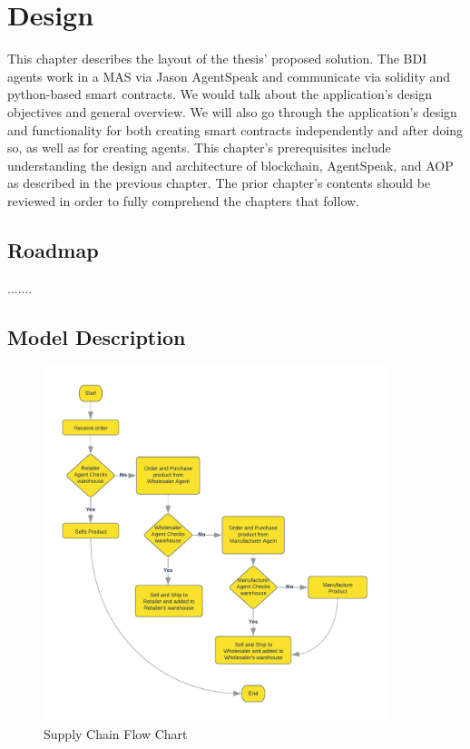 \ifx\doclanguage\english
\chapter{Design}

This chapter describes the layout of the thesis' proposed solution. The \ac{BDI} agents work in a \ac{MAS} via Jason AgentSpeak and communicate via solidity and python-based smart contracts. We would talk about the application's design objectives and general overview. We will also go through the application's design and functionality for both creating smart contracts independently and after doing so, as well as for creating agents. This chapter's prerequisites include understanding the design and architecture of blockchain, AgentSpeak, and \ac{AOP} as described in the previous chapter. The prior chapter's contents should be reviewed in order to fully comprehend the chapters that follow.

\section{Roadmap}
.......

\section{Model Description}

    \begin{figure}[h]
    \centering
      \includegraphics[width=10cm]{includes/figures/Flow Chart.png}
      \caption{Supply Chain Flow Chart}
      \label{Flow chart}
    \end{figure}


